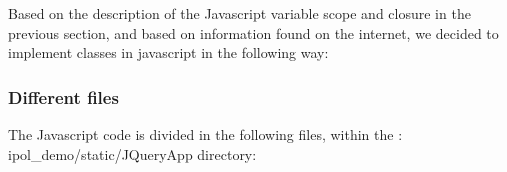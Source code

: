 Based on the description of the Javascript variable scope and closure in the previous section,
and based on information found on the internet, we decided to implement classes in
javascript in the following way:

%


\subsubsection{Different files}

The Javascript code is divided in the following files, within the :
ipol\_demo/\-static/\-JQuery\-App directory:
